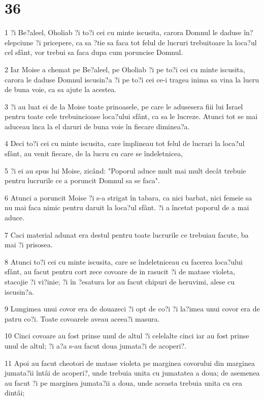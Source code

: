 \chapter{36}

\par 1 ?i Be?aleel, Oholiab ?i to?i cei cu minte iscusita, carora Domnul le daduse în?elepciune ?i pricepere, ca sa ?tie sa faca tot felul de lucruri trebuitoare la loca?ul cel sfânt, vor trebui sa faca dupa cum poruncise Domnul.
\par 2 Iar Moise a chemat pe Be?aleel, pe Oholiab ?i pe to?i cei cu minte iscusita, carora le daduse Domnul iscusin?a ?i pe to?i cei ce-i tragea inima sa vina la lucru de buna voie, ca sa ajute la acestea.
\par 3 ?i au luat ei de la Moise toate prinoasele, pe care le adusesera fiii lui Israel pentru toate cele trebuincioase loca?ului sfânt, ca sa le lucreze. Atunci tot se mai aduceau înca la el daruri de buna voie în fiecare diminea?a.
\par 4 Deci to?i cei cu minte iscusita, care împlineau tot felul de lucrari la loca?ul sfânt, au venit fiecare, de la lucru cu care se îndeletnicea,
\par 5 ?i ei au spus lui Moise, zicând: "Poporul aduce mult mai mult decât trebuie pentru lucrurile ce a poruncit Domnul sa se faca".
\par 6 Atunci a poruncit Moise ?i s-a strigat în tabara, ca nici barbat, nici femeie sa nu mai faca nimic pentru daruit la loca?ul sfânt. ?i a încetat poporul de a mai aduce.
\par 7 Caci material adunat era destul pentru toate lucrurile ce trebuiau facute, ba mai ?i prisosea.
\par 8 Atunci to?i cei cu minte iscusita, care se îndeletniceau cu facerea loca?ului sfânt, au facut pentru cort zece covoare de in rasucit ?i de matase violeta, stacojie ?i vi?inie; ?i în ?esatura lor au facut chipuri de heruvimi, alese cu iscusin?a.
\par 9 Lungimea unui covor era de douazeci ?i opt de co?i ?i la?imea unui covor era de patru co?i. Toate covoarele aveau aceea?i masura.
\par 10 Cinci covoare au fost prinse unul de altul ?i celelalte cinci iar au fost prinse unul de altul; ?i a?a s-au facut doua jumata?i de acoperi?.
\par 11 Apoi au facut cheotori de matase violeta pe marginea covorului din marginea jumata?ii întâi de acoperi?, unde trebuia unita cu jumatatea a doua; de asemenea au facut ?i pe marginea jumata?ii a doua, unde aceasta trebuia unita cu cea dintâi;

